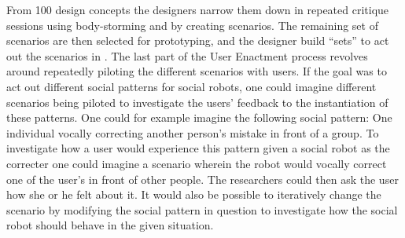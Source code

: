 From 100 design concepts the designers narrow them down in repeated critique sessions using body-storming and by creating scenarios. The remaining set of scenarios are then selected for prototyping, and the designer build ``sets'' to act out the scenarios in \parencite{Odom:2012:FFU:2317956.2318008}. The last part of the User Enactment process revolves around repeatedly piloting the different scenarios with users. If the goal was to act out different social patterns for social robots, one could imagine different scenarios being piloted to investigate the users' feedback to the instantiation of these patterns. One could for example imagine the following social pattern: One individual vocally correcting another person's mistake in front of a group. To investigate how a user would experience this pattern given a social robot as the correcter one could imagine a scenario wherein the robot would vocally correct one of the user's in front of other people. The researchers could then ask the user how she or he felt about it. It would also be possible to iteratively change the scenario by modifying the social pattern in question to investigate how the social robot should behave in the given situation.

\subsubsection{}